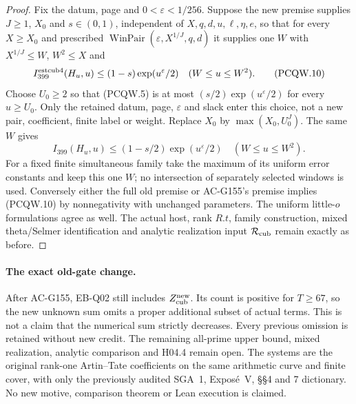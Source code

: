 \begin{proof}
Fix the datum, page and $0<\varepsilon<1/256$.
Suppose the new premise supplies $J\geq1$, $X_0$ and
$s\in(0,1)$, independent of $X,q,d,u,\ell,\eta,e$, so that
for every $X\geq X_0$ and prescribed
$\operatorname{WinPair}(\varepsilon,X^{1/J},q,d)$ it supplies
one $W$ with $X^{1/J}\leq W$, $W^2\leq X$ and
\[
 I_{399}^{\rm estcub4}(H_u,u)\leq(1-s)\exp(u^\varepsilon/2)
                                 \quad(W\leq u\leq W^2).
 \tag{PCQW.10}
\]
Choose $U_0\geq2$ so that (PCQW.5) is at most
$(s/2)\exp(u^\varepsilon/2)$ for every $u\geq U_0$.
Only the retained datum, page, $\varepsilon$ and slack enter
this choice, not a new pair, coefficient, finite label or weight.
Replace $X_0$ by $\max(X_0,U_0^J)$.  The same $W$ gives
\[
 I_{399}(H_u,u)\leq(1-s/2)\exp(u^\varepsilon/2)
                                 \quad(W\leq u\leq W^2).
 \tag{PCQW.11}
\]
For a fixed finite simultaneous family take the maximum of its
uniform error constants and keep this one $W$; no intersection
of separately selected windows is used.
Conversely either the full old premise or AC-G155's premise
implies (PCQW.10) by nonnegativity with unchanged parameters.
The uniform little-$o$ formulations agree as well.
The actual host, rank $R.t$, family construction, mixed
theta/Selmer identification and analytic realization input
$\mathcal R_{\rm cub}$ remain exactly as before.
\end{proof}

\paragraph{The exact old-gate change.}
After AC-G155, EB-Q02 still includes $Z_{\rm cub}^{\rm new}$.
Its count is positive for $T\geq67$, so the new unknown sum
omits a proper additional subset of actual terms.
This is not a claim that the numerical sum strictly decreases.
Every previous omission is retained without new credit.
The remaining all-prime upper bound, mixed realization,
analytic comparison and H04.4 remain open.
The systems are the original rank-one Artin--Tate coefficients
on the same arithmetic curve and finite cover, with only the
previously audited SGA~1, Expos\'e~V, \S\S4 and 7 dictionary.
No new motive, comparison theorem or Lean execution is claimed.
